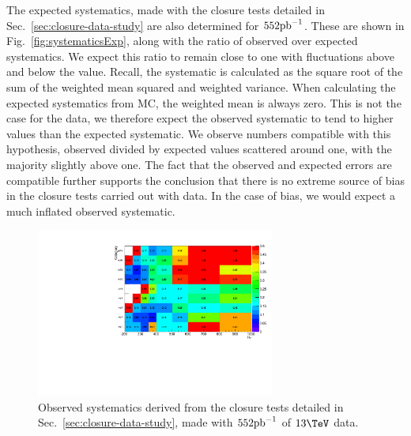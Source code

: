 The expected systematics, made with the
closure tests detailed in Sec.~\ref{sec:closure-data-study} are also
determined for $552\ipb$. These are shown in
Fig.~\ref{fig:systematicsExp}, along with the ratio of observed over
expected systematics. We expect this ratio to remain close to one with
fluctuations above and below the value. Recall, the
systematic is calculated as the square root of the sum of the weighted
mean squared and weighted variance. When calculating the expected
systematics from MC, the weighted mean is always zero. This is not the
case for the data, we therefore expect the observed systematic to
tend to higher values than the expected systematic. We observe numbers
compatible with this hypothesis, observed divided by expected values
scattered around one, with the majority slightly above one. The fact
that the observed and expected errors are compatible further supports
the conclusion that there is no extreme source of bias in the closure
tests carried out with data. In the case of bias, we would expect a
much inflated observed systematic.

\begin{figure}[]
  \centering
  \includegraphics[width=0.7\textwidth]{figures/closureTests/552pb/obs2D.pdf}
  \caption{\label{fig:systematicsObs} Observed systematics derived from
  the closure tests detailed in Sec.~\ref{sec:closure-data-study}, made with $552\ipb$ of $13\tev$ data.}
\end{figure}

